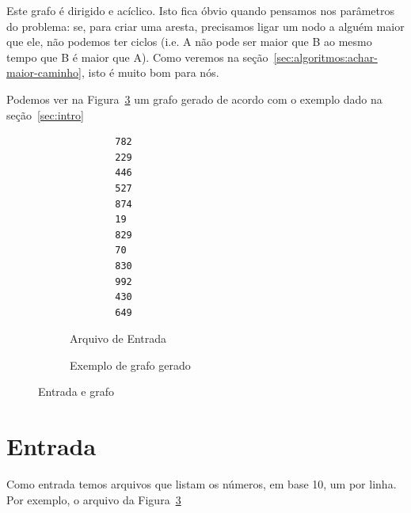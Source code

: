 \documentclass[12pt]{article}
\begin{document}
Este grafo é dirigido e acíclico. Isto fica óbvio quando pensamos nos parâmetros do problema: se, para criar uma aresta, precisamos ligar um nodo a alguém maior que ele, não podemos ter ciclos (i.e. A não pode ser maior que B ao mesmo tempo que B é maior que A). Como veremos na se\c{c}ão~\ref{sec:algoritmos:achar-maior-caminho}, isto é muito bom para nós.


Podemos ver na Figura~\ref{fig:testeprof} um grafo gerado de acordo com o exemplo dado na se\c{c}ão~\ref{sec:intro}

\begin{figure}[H]
  \noindent %
  \begin{minipage}[t]{0.3\columnwidth}%
    \begin{figure}
        \begin{lstlisting}
        782
        229
        446
        527
        874
        19
        829
        70
        830
        992
        430
        649
        \end{lstlisting}
        \caption{Arquivo de Entrada}
        \label{fig:testeprof:entrada}
      \end{figure}
  \end{minipage}
  \begin{minipage}[t][1\totalheight][b]{0.65\textwidth}%
    \begin{figure}
        \begin{dot2tex}[neato,options=-tmath]
            
        \end{dot2tex}
        \caption{Exemplo de grafo gerado}
        \label{fig:testeprof:grafo}
    \end{figure}
  \end{minipage}
  \caption{Entrada e grafo}
  \label{fig:testeprof}
\end{figure}

\section{Entrada}\label{sec:entrada}
Como entrada temos arquivos que listam os números, em base 10, um por linha. Por exemplo, o arquivo da Figura~\ref{fig:testeprof}
\end{document}
